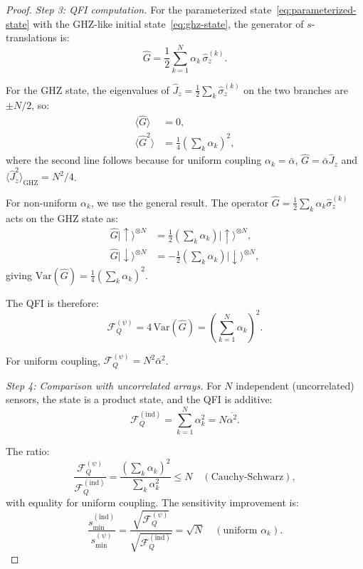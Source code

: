\documentclass[aps,prl,twocolumn,superscriptaddress,showpacs]{revtex4-2}
\theoremstyle{definition}
\begin{document}
\begin{proof}
\textit{Step 3: QFI computation.}
For the parameterized state~\eqref{eq:parameterized-state} with the
GHZ-like initial state~\eqref{eq:ghz-state}, the generator of
$s$-translations is:
\begin{equation}
\hat{G} = \frac{1}{2}\sum_{k=1}^N \alpha_k\,\hat{\sigma}_z^{(k)}.
\label{eq:generator}
\end{equation}

For the GHZ state, the eigenvalues of $\hat{J}_z = \frac{1}{2}\sum_k\hat{\sigma}_z^{(k)}$
on the two branches are $\pm N/2$, so:
\begin{align}
\langle\hat{G}\rangle &= 0, \label{eq:G-mean}\\
\langle\hat{G}^2\rangle &= \frac{1}{4}\left(\sum_k\alpha_k\right)^2,
\label{eq:G-variance}
\end{align}
where the second line follows because for uniform coupling
$\alpha_k = \bar{\alpha}$, $\hat{G} = \bar{\alpha}\hat{J}_z$ and
$\langle\hat{J}_z^2\rangle_{\mathrm{GHZ}} = N^2/4$.

For non-uniform $\alpha_k$, we use the general result. The operator
$\hat{G} = \frac{1}{2}\sum_k\alpha_k\hat{\sigma}_z^{(k)}$ acts on
the GHZ state as:
\begin{align}
\hat{G}|{\uparrow}\rangle^{\otimes N} &= \frac{1}{2}\left(\sum_k\alpha_k\right)
|{\uparrow}\rangle^{\otimes N}, \\
\hat{G}|{\downarrow}\rangle^{\otimes N} &= -\frac{1}{2}\left(\sum_k\alpha_k\right)
|{\downarrow}\rangle^{\otimes N},
\end{align}
giving $\mathrm{Var}(\hat{G}) = \frac{1}{4}(\sum_k\alpha_k)^2$.

The QFI is therefore:
\begin{equation}
\mathcal{F}_Q^{(\psi)} = 4\,\mathrm{Var}(\hat{G})
= \left(\sum_{k=1}^N\alpha_k\right)^2.
\label{eq:qfi-result}
\end{equation}

For uniform coupling, $\mathcal{F}_Q^{(\psi)} = N^2\bar{\alpha}^2$.

\textit{Step 4: Comparison with uncorrelated arrays.}
For $N$ independent (uncorrelated) sensors, the state is a product
state, and the QFI is additive:
\begin{equation}
\mathcal{F}_Q^{(\mathrm{ind})} = \sum_{k=1}^N \alpha_k^2
= N\overline{\alpha^2}.
\label{eq:qfi-sql}
\end{equation}

The ratio:
\begin{equation}
\frac{\mathcal{F}_Q^{(\psi)}}{\mathcal{F}_Q^{(\mathrm{ind})}}
= \frac{(\sum_k\alpha_k)^2}{\sum_k\alpha_k^2}
\leq N \quad (\text{Cauchy-Schwarz}),
\label{eq:qfi-ratio}
\end{equation}
with equality for uniform coupling. The sensitivity improvement is:
\begin{equation}
\frac{s_{\min}^{(\mathrm{ind})}}{s_{\min}^{(\psi)}}
= \frac{\sqrt{\mathcal{F}_Q^{(\psi)}}}{\sqrt{\mathcal{F}_Q^{(\mathrm{ind})}}}
= \sqrt{N} \quad (\text{uniform } \alpha_k).
\label{eq:sensitivity-ratio}
\end{equation}


\end{proof}
\end{document}
